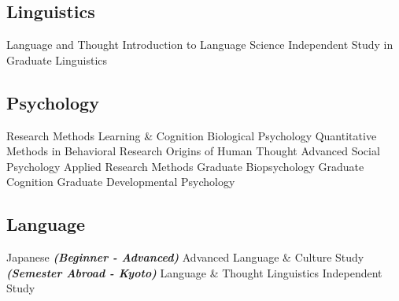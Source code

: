 \documentclass[letterpaper]{deedy-resume_sm} %
\begin{document}
\subsection{Linguistics}
Language and Thought \textbullet{} 
Introduction to Language Science \textbullet{} 
Independent Study in Graduate Linguistics \textbullet{} 
\sectionspace
\subsection{Psychology}
Research Methods \textbullet{} 
Learning \& Cognition \textbullet{} 
Biological Psychology \textbullet{} 
Quantitative Methods in Behavioral Research \textbullet{} 
Origins of Human Thought \textbullet{} 
Advanced Social Psychology \textbullet{} 
Applied Research Methods \textbullet{} 
Graduate Biopsychology \textbullet{} 
Graduate Cognition \textbullet{} 
Graduate Developmental Psychology \textbullet{} 
\sectionspace %
\subsection{Language}
Japanese \textbullet{} 
{\footnotesize \textit{\textbf{(Beginner - Advanced)}}} \textbullet{} 
Advanced Language \& Culture Study \textbullet{} 
{\footnotesize \textit{\textbf{(Semester Abroad - Kyoto)}}} \textbullet{} 
Language \& Thought \textbullet{} 
Linguistics Independent Study \textbullet{} 
\sectionspace

\end{document}
